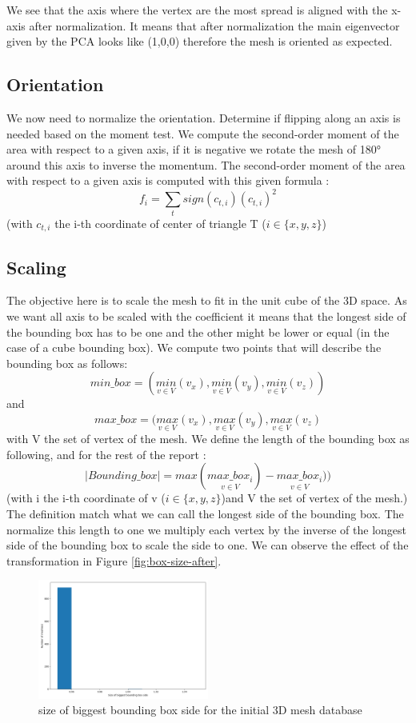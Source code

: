 \documentclass[10pt,twocolumn,letterpaper]{article}
\begin{document}
	We see that the axis where the vertex are the most spread is aligned with the x-axis after normalization. It means that after normalization the main eigenvector given by the PCA looks like (1,0,0) therefore the mesh is oriented as expected.
	
\subsection{Orientation}
	We now need to normalize the orientation. Determine if flipping along an axis is needed based on the moment test. We compute the second-order moment of the area with respect to a given axis, if it is negative we rotate the mesh of 180° around this axis to inverse the momentum.
	The second-order moment of the area with respect to a given axis is computed with this given formula :
	$$ f_i = \sum_{t} sign(c_{t,i})(c_{t,i})^2  $$ (with $c_{t,i}$ the i-th coordinate of center of triangle T ($i \in \{x,y,z\}$)
	

\subsection{Scaling}
	The objective here is to scale the mesh to fit in the unit cube of the 3D space. As we want all axis to be scaled with the coefficient it means that the longest side of the bounding box has to be one and the other might be lower or equal (in the case of a cube bounding box).
	We compute two points that will describe the bounding box as follows:
	$$min\_box = (\underset{v \in V}{min}(v_x),\underset{v \in V}{min}(v_y),\underset{v \in V}{min}(v_z)) $$ and $$max\_box = (\underset{v \in V}{max}(v_x), \underset{v \in V}{max}(v_y), \underset{v \in V}{max}(v_z)$$ with V the set of vertex of the mesh.
	We define the length of the bounding box as following, and for the rest of the report :
	$$ |Bounding\_box| = max(\underset{v \in V}{max\_box_i}) - \underset{v \in V}{max\_box_i}))$$ (with i the i-th coordinate of v ($i \in \{x,y,z\}$)and V the set of vertex of the mesh.)
	The definition match what we can call the longest side of the bounding box. The normalize this length to one we multiply each vertex by the inverse of the longest side of the bounding box to scale the side to one. We can observe the effect of the transformation in Figure \ref{fig:box-size-after}.

\begin{figure}[h!]
\begin{center}
  \includegraphics[width=0.5\textwidth]{picture/Initial size of biggest bounding box side}
  \caption{size of biggest bounding box side for the initial 3D mesh database}
  \label{fig:box-size-before}
  \end{center}
\end{figure}
\end{document}
